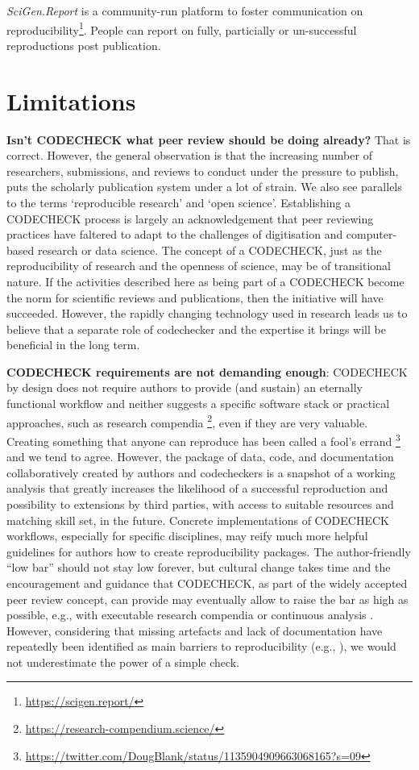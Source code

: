 \documentclass[12pt]{article}
\begin{document}
\emph{SciGen.Report} is a community-run platform to foster communication on
reproducibility\footnote{\url{https://scigen.report/}}. People can report on
fully, particially or un-successful reproductions post publication.

\section*{Limitations}\label{limitations}

\textbf{Isn't CODECHECK what peer review should be doing already?}
That is correct.  However, the general observation is that the
increasing number of researchers, submissions, and reviews to conduct
under the pressure to publish, puts the scholarly publication system
under a lot of strain.  We also see parallels to the terms
`reproducible research' and `open science'. Establishing a CODECHECK
process is largely an acknowledgement that peer reviewing practices
have faltered to adapt to the challenges of digitisation and
computer-based research or data science. The concept of a CODECHECK,
just as the reproducibility of research and the openness of science,
may be of transitional nature. If the activities described here as
being part of a CODECHECK become the norm for scientific reviews and
publications, then the initiative will have succeeded.  However, the
rapidly changing technology used in research leads us to believe that
a separate role of codechecker and the expertise it brings will be
beneficial in the long term.

\textbf{CODECHECK requirements are not demanding enough}:
CODECHECK by design does not require authors to provide (and sustain) an
eternally functional workflow and neither suggests a specific software stack
or practical approaches, such as research compendia
\footnote{\url{https://research-compendium.science/}},
even if they are very valuable.
Creating something that anyone can reproduce has been called a 
fool's errand
\footnote{\url{https://twitter.com/DougBlank/status/1135904909663068165?s=09}}
and we tend to agree.
However, the package of data, code, and documentation
collaboratively created by authors and codecheckers is a snapshot of a 
working analysis that greatly increases the likelihood of a successful 
reproduction and possibility to extensions by third parties, with access
to suitable resources and matching skill set, in the future.
Concrete implementations of CODECHECK workflows, especially for specific
disciplines, may reify much more helpful guidelines for authors how to
create reproducibility packages.
The author-friendly ``low bar'' should not stay low forever, but cultural
change takes time and the encouragement and guidance that CODECHECK,
as part of the widely accepted peer review concept, can provide may
eventually allow to raise the bar as high as possible, e.g., with
executable research compendia \cite{nust_opening_2017}
or continuous analysis \cite{beaulieu-jones_reproducibility_2017-1}.
However, considering that missing artefacts and lack of documentation
have repeatedly been identified as main barriers to reproducibility
(e.g., \cite{stagge_assessing_2019,nust_improving_2020}),
we would not underestimate the power of a simple check.
\end{document}
